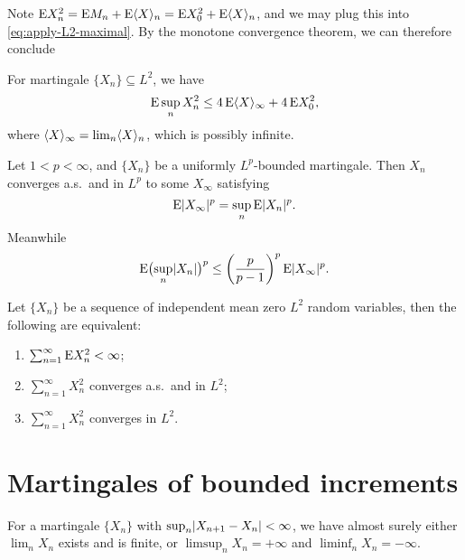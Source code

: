 Note $\mathop{}\!\mathrm{E} X_n^2 = \mathop{}\!\mathrm{E} M_n + \mathop{}\!\mathrm{E} \langle X \rangle_n = \mathop{}\!\mathrm{E} X_0^2 + \mathop{}\!\mathrm{E} \langle X \rangle_n$, and we may plug this into \eqref{eq:apply-L2-maximal}. By the monotone convergence theorem, we can therefore conclude 

\begin{prop}
    For martingale $\{X_n\} \subseteq L^2$, we have \[
    \mathop{}\!\mathrm{E} \sup_n  X_n^2 \leq  4 \mathop{}\!\mathrm{E} \langle X \rangle_\infty + 4 \mathop{}\!\mathrm{E} X_0^2,
\] where $\langle X \rangle_\infty = \lim_n \langle X \rangle_n$, which is possibly infinite.
\end{prop}


\begin{namedthm}
    Let $1<p<\infty$, and $\{X_n\}$ be a uniformly $L^p$-bounded martingale. Then $X_n$ converges a.s.\ and in $L^p$ to some $X_\infty$ satisfying \[
        \mathop{}\!\mathrm{E} \lvert X_\infty \rvert^p = \sup_n \mathop{}\!\mathrm{E}\lvert X_n \rvert^p.
    \] Meanwhile \[
        \mathop{}\!\mathrm{E} \bigl(\sup_n\lvert X_n \rvert\bigr)^p \leq \biggl(\frac{p}{p-1}\biggr)^p \mathop{}\!\mathrm{E}\lvert X_\infty \rvert^p.
    \]

    \begin{thm}
    Let $\{X_n\}$ be a sequence of independent mean zero $L^2$ random variables, then the following are equivalent: \begin{enumerate}
        \item $\sum_{n=1}^\infty \mathop{}\!\mathrm{E} X_n^2 < \infty$;
        \item $\sum_{n=1}^\infty X_n^2$ converges a.s.\ and in $L^2$;
        \item $\sum_{n=1}^\infty X_n^2$ converges in $L^2$.
    \end{enumerate}
\end{thm}
\end{namedthm}


\section{Martingales of bounded increments}
\begin{thm}
    For a martingale $\{X_n\}$ with $\sup_n \lvert X_{n+1} - X_n \rvert < \infty$, we have almost surely either $\lim_n X_n$ exists and is finite, or $\limsup_n X_n= +\infty$ and $\liminf_n X_n = -\infty$. 
\end{thm}

